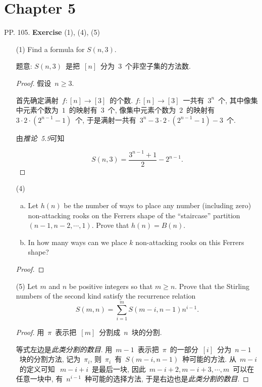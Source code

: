 \documentclass[UTF8,a4paper,10pt]{article}
\begin{document}
\section*{Chapter 5}
PP. 105. {\bf Exercise} (1), (4), (5)
\begin{enumerate}
	\item[(1)] Find a formula for $S(n, 3)$.

	      题意: $S(n,3)$~是把~$[n]$~分为~$3$~个非空子集的方法数.
	      \begin{proof}
		      假设~$n\geqslant 3$.

		      首先确定满射~$f\colon [n]\to[3]$~的个数. $f\colon [n]\to[3]$~一共有~$3^n$~个, 其中像集中元素个数为~$1$~的映射有~$3$~个, 像集中元素个数为~$2$~的映射有~$3\cdot 2\cdot(2^{n-1}-1)$~个, 于是满射一共有~$3^n- 3\cdot 2\cdot(2^{n-1}-1)-3$~个.

		      由\emph{推论~5.9}可知

		      \[
			      S(n,3)=\dfrac{3^{n-1}+1}{2}-2^{n-1}.
		      \]
	      \end{proof}
	\item[(4)]
	      \begin{enumerate}[(a)]
		      \item Let $h(n)$ be the number of ways to place any number (including
		            zero) non-attacking rooks on the Ferrers shape of the “staircase”
		            partition $(n-1, n-2, \cdots , 1)$. Prove that $h(n) = B(n)$.
		      \item In how many ways can we place $k$ non-attacking rooks on this
		            Ferrers shape?
	      \end{enumerate}
	      \begin{proof}

	      \end{proof}

	\item[(5)] Let $m$ and $n$ be positive integers so that $m \geqslant n$. Prove that the
	      Stirling numbers of the second kind satisfy the recurrence relation
	      \[ S(m, n) = \sum_{i=1}^{m} S(m-i, n-1)n^{i-1} .\]

	      \begin{proof}
		      用~$\pi$~表示把~$[m]$~分割成~$n$~块的分割.

		      等式左边是\emph{此类分割的数目}.
		      用~$m-1$~表示把~$\pi$~的一部分~$[i]$~分为~$n-1$~块的分割方法, 记为~$\pi_i$, 则~$\pi_i$~有~$S(m-i,n-1)$~种可能的方法. 从~$m-i$~的定义可知~$~m-i+i$~是最后一块, 因此~$m-i+2,m-i+3,\cdots,m$~可以在任意一块中, 有~$n^{i-1}$~种可能的选择方法, 于是右边也是\emph{此类分割的数目}.
	      \end{proof}
\end{enumerate}
\end{document}

